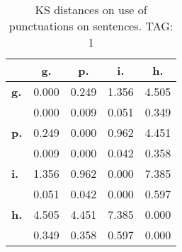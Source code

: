 \begin{table}[h!]
\begin{center}
\begin{tabular}{| l || c | c | c | c |}\hline
 & {\bf g.} & {\bf p.} & {\bf i.} & {\bf h.} \\\hline\hline
{\bf g.} & 0.000 & 0.249 & 1.356 & 4.505 \\
{\bf } & 0.000 & 0.009 & 0.051 & 0.349 \\\hline
{\bf p.} & 0.249 & 0.000 & 0.962 & 4.451 \\
{\bf } & 0.009 & 0.000 & 0.042 & 0.358 \\\hline
{\bf i.} & 1.356 & 0.962 & 0.000 & 7.385 \\
{\bf } & 0.051 & 0.042 & 0.000 & 0.597 \\\hline
{\bf h.} & 4.505 & 4.451 & 7.385 & 0.000 \\
{\bf } & 0.349 & 0.358 & 0.597 & 0.000 \\\hline
\end{tabular}
\caption{KS distances on use of punctuations on sentences. TAG: 1}
\end{center}
\end{table}